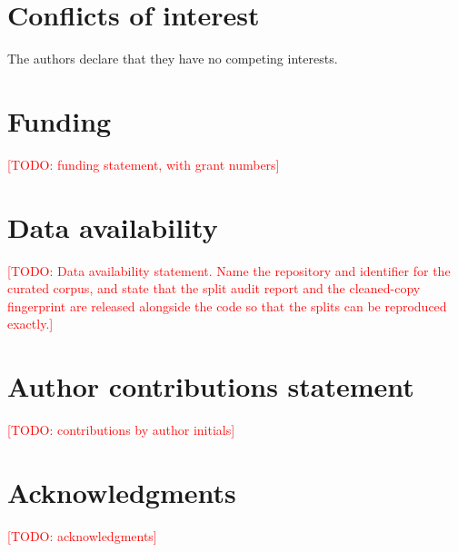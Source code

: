 \documentclass[webpdf,modern,large,namedate]{oup-authoring-template}
\theoremstyle{thmstyleone}
\theoremstyle{thmstyletwo}
\theoremstyle{thmstylethree}
\DeclareRobustCommand{\TODO}[1]{\textcolor{red}{[TODO: #1]}}
\begin{document}

\section*{Conflicts of interest}
The authors declare that they have no competing interests.

\section*{Funding}
\TODO{funding statement, with grant numbers}

\section*{Data availability}
\TODO{Data availability statement. Name the repository and identifier for the
curated corpus, and state that the split audit report and the cleaned-copy
fingerprint are released alongside the code so that the splits can be
reproduced exactly.}

\section*{Author contributions statement}
\TODO{contributions by author initials}

\section*{Acknowledgments}
\TODO{acknowledgments}




\end{document}
